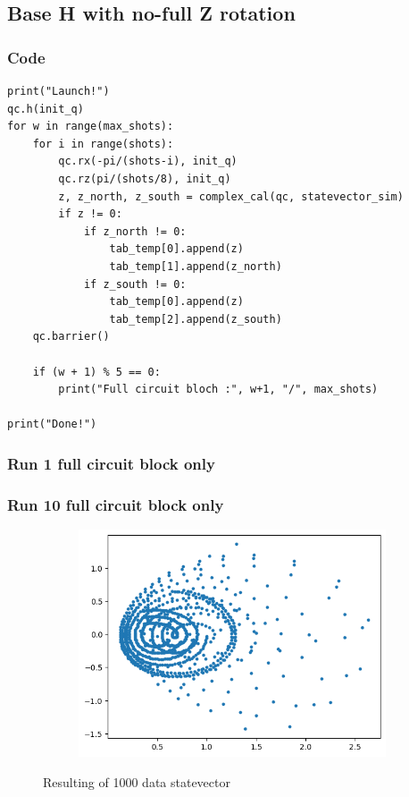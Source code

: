 \subsection{Base H with no-full Z rotation}

\subsubsection{Code}
\begin{lstlisting}
print("Launch!")
qc.h(init_q)
for w in range(max_shots):
    for i in range(shots):
        qc.rx(-pi/(shots-i), init_q)
        qc.rz(pi/(shots/8), init_q)
        z, z_north, z_south = complex_cal(qc, statevector_sim)
        if z != 0:
            if z_north != 0:
                tab_temp[0].append(z)
                tab_temp[1].append(z_north)
            if z_south != 0:
                tab_temp[0].append(z)
                tab_temp[2].append(z_south)
    qc.barrier()
    
    if (w + 1) % 5 == 0:
        print("Full circuit bloch :", w+1, "/", max_shots)

print("Done!")
\end{lstlisting}

\subsubsection{Run 1 full circuit block only}

\subsubsection{Run 10 full circuit block only}
\begin{figure}[ht!]
        \centering
        \begin{subfigure}[c]{0.5\textwidth}
                \includegraphics[width=\textwidth]{Chapitre1/Figures/exp1_10_baseH_halfZ_nonZoom.png}
        \end{subfigure}%
        \caption{Resulting of 1000 data statevector}
\end{figure}


